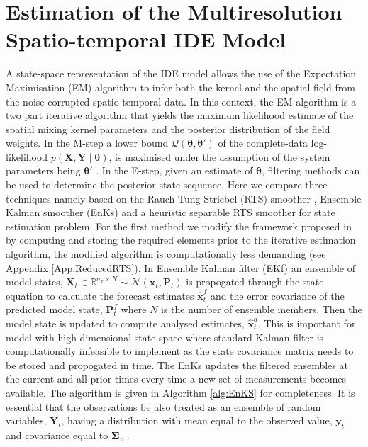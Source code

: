 \documentclass[journal,a4paper]{IEEEtran}
\begin{document}
\section{Estimation of the Multiresolution Spatio-temporal IDE Model}
A state-space representation of the IDE model allows the use of the Expectation Maximisation (EM) algorithm to infer both the kernel and the spatial field from the noise corrupted spatio-temporal data. In this context, the EM algorithm is a two part iterative algorithm that yields the maximum likelihood estimate of the spatial mixing kernel parameters and the posterior distribution of the field weights. In the M-step a lower bound $\mathcal{Q}\left(\boldsymbol\theta,\boldsymbol\theta'\right)$ of the complete-data log-likelihood  $p\left(\mathbf{X},\mathbf{Y} \mid \boldsymbol\theta \right)$, is maximised under the assumption of the system parameters being $\boldsymbol\theta'$ \cite{McLachlan1997}. In the E-step, given an estimate of $\boldsymbol\theta$, filtering methods can be used to determine the posterior state sequence. Here we compare three techniques namely based on  the Rauch Tung Striebel (RTS) smoother \cite{Gibsona2005}, Ensemble Kalman smoother (EnKs) \cite{Evensen2003} and a heuristic separable RTS smoother for state estimation problem. For the first method we modify the framework proposed in \cite{Dewar2009} by computing and storing the required elements prior to the iterative estimation algorithm, the modified algorithm is computationally less demanding (see Appendix \ref{App:ReducedRTS}). In Ensemble Kalman filter (EKf) an ensemble of model states, $\mathbf X_t \in \mathbb R^{n_x \times N} \sim \mathcal N(\mathbf x_t,\mathbf P_t)$ is propogated through the state equation to calculate the forecast estimates $\hat{\mathbf x}^f_t$ and the error covariance of the predicted model state, $\mathbf P_t^f$ where $N$ is the number of ensemble members. Then  the model state is updated to compute analysed estimates, $\hat {\mathbf x}_t^a$.  This is important for model with high dimensional state space where standard Kalman filter  is computationally infeasible to implement as the state covariance matrix needs to be stored and propogated in time. The EnKs updates the filtered ensembles at the current and all prior times every time a new set of measurements becomes available. The algorithm is given in Algorithm \ref{alg:EnKS} for completeness. It is essential that the observations be also treated as an ensemble of random variables, $\mathbf Y_t$, having a distribution with mean equal to the observed value, $\mathbf y_t$ and covariance equal to $\boldsymbol\Sigma_v$ \cite{Houtekamer2005}. 
\end{document}
